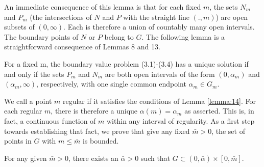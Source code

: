 An immediate consequence of this lemma is that for each fixed $m$,
the sets $N_m$ and $P_m$ (the intersections of $N$ and $P$ with 
the straight line $(., m)$) are open subsets of $(0, \infty)$. 
Each is therefore a union of countably many open intervals.
The boundary points of $N$ or $P$ belong to $G$.
The following lemma is a straightforward consequence of Lemmas 8 and 13.

\begin{lemma}\label{lemma:14}
  For a fixed m, the boundary value problem (3.1)-(3.4) has a unique solution if and only if
  the sets $P_m$ and $N_m$ are both open intervals of the form $\left(0, \alpha_m\right)$ and
  $\left(\alpha_m, \infty\right)$, respectively,
  with one single common endpoint $\alpha_m \in G_m$.
\end{lemma}

We call a point $m$ regular if it satisfies the conditions of Lemma \ref{lemma:14}.
For each regular $m$, there is therefore a unique $\alpha(m)=\alpha_m$ as asserted.
This is, in fact, a continuous function of $m$ within any interval of regularity.
As a first step towards establishing that fact, we prove that give any fixed $\bar{m}>0$,
the set of points in $G$ with $m \leq \bar{m}$ is bounded.

\begin{lemma}\label{lemma:15}
  For any given $\bar{m}>0$, there exists an $\bar{\alpha}>0$
  such that $G\subset (0, \bar{\alpha})\times[0, \bar{m}]$.
\end{lemma}

